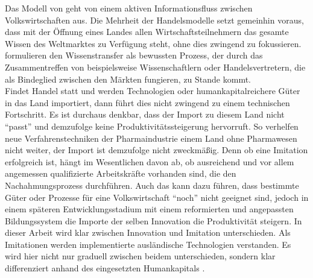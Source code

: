 %
Das Modell von \cite{Grossman.1990c} geht von einem aktiven Informationsfluss zwischen Volkswirtschaften aus. Die Mehrheit der Handelsmodelle setzt gemeinhin voraus, dass mit der Öffnung eines Landes allen Wirtschaftsteilnehmern das gesamte Wissen des Weltmarktes zu Verfügung steht, ohne dies zwingend zu fokussieren. \cite{Grossman.1990c} formulieren den Wissenstransfer als bewussten Prozess, der durch das Zusammentreffen von beispielsweise Wissenschaftlern oder Handelsvertretern, die als Bindeglied zwischen den Märkten fungieren, zu Stande kommt.\\
%
Findet Handel statt und werden Technologien oder humankapitalreichere Güter in das Land importiert, dann führt dies nicht zwingend zu einem technischen Fortschritt. Es ist durchaus denkbar, dass der Import zu diesem Land nicht "`passt"' und demzufolge keine Produktivitätssteigerung hervorruft. So verhelfen neue Verfahrenstechniken der Pharmaindustrie einem Land ohne Pharmawesen nicht weiter, der Import ist demzufolge nicht zweckmäßig. Denn ob eine Imitation erfolgreich ist, hängt im Wesentlichen davon ab, ob ausreichend und vor allem angemessen qualifizierte Arbeitskräfte vorhanden sind, die den Nachahmungsprozess durchführen. Auch das kann dazu führen, dass bestimmte Güter oder Prozesse für eine Volkswirtschaft "`noch"' nicht geeignet sind, jedoch in einem späteren Entwicklungsstadium mit einem reformierten und angepassten Bildungssystem die Importe der selben Innovation die Produktivität steigern.
%
In dieser Arbeit wird klar zwischen Innovation und Imitation unterschieden. Als Imitationen werden implementierte ausländische Technologien verstanden. Es wird hier nicht nur graduell zwischen beidem unterschieden, sondern klar differenziert anhand des eingesetzten Humankapitals \cite[S.883]{Cohen.1989,Griffith.2004}.
%
